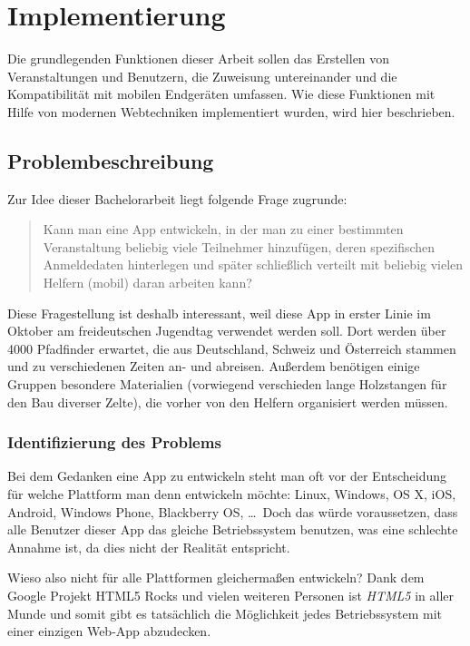 \chapter{Implementierung}
Die grundlegenden Funktionen dieser Arbeit sollen das Erstellen von Veranstaltungen und Benutzern, die Zuweisung untereinander und die Kompatibilität mit mobilen Endgeräten umfassen. Wie diese Funktionen mit Hilfe von modernen Webtechniken implementiert wurden, wird hier beschrieben.

\section{Problembeschreibung}
Zur Idee dieser Bachelorarbeit liegt folgende Frage zugrunde:

\begin{quote}
	Kann man eine App entwickeln, in der man zu einer bestimmten Veranstaltung beliebig viele Teilnehmer hinzufügen, deren spezifischen Anmeldedaten hinterlegen und später schließlich verteilt mit beliebig vielen Helfern (mobil) daran arbeiten kann? 
\end{quote}

Diese Fragestellung ist deshalb interessant, weil diese App in erster Linie im Oktober am freideutschen Jugendtag verwendet werden soll. Dort werden über 4000 Pfadfinder erwartet, die aus Deutschland, Schweiz und Österreich stammen und zu verschiedenen Zeiten an- und abreisen. Außerdem benötigen einige Gruppen besondere Materialien (vorwiegend verschieden lange Holzstangen für den Bau diverser Zelte), die vorher von den Helfern organisiert werden müssen.\par

\subsection{Identifizierung des Problems}
Bei dem Gedanken eine App zu entwickeln steht man oft vor der Entscheidung für welche Plattform man denn entwickeln möchte: Linux, Windows, OS X, iOS, Android, Windows Phone, Blackberry OS, \dots \ Doch das würde voraussetzen, dass alle Benutzer dieser App das gleiche Betriebssystem benutzen, was eine schlechte Annahme ist, da dies nicht der Realität entspricht.\par

Wieso also nicht für alle Plattformen gleichermaßen entwickeln? Dank dem Google Projekt \glqq HTML5 Rocks\grqq{}\cite{html5rocksmain} und vielen weiteren Personen ist \emph{HTML5} in aller Munde und somit gibt es tatsächlich die Möglichkeit jedes Betriebssystem mit einer einzigen Web-App abzudecken.\par

